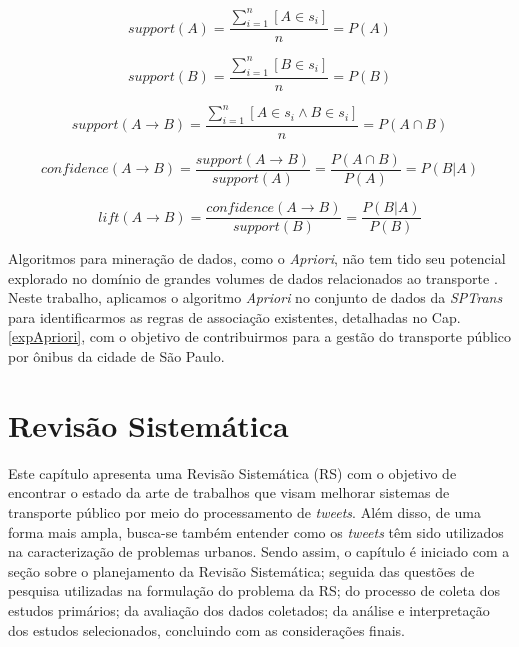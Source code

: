 \documentclass[
	12pt,				%
	oneside,			%
	a4paper,			%
	english,			%
	brazil				%
	]{abntex2ppgsi}
\begin{document}
{{\begin{equation}
\label{eqSupportA}
support(A) = \dfrac{\sum_{i=1}^{n}[A \in s_i]} {n} = P(A) 
\end{equation}

\begin{equation}
\label{eqSupportB}
support(B) = \dfrac{\sum_{i=1}^{n}[B \in s_i]} {n} = P(B) 
\end{equation}

\begin{equation}
\label{eqSupports}
support(A \rightarrow B) = \dfrac{\sum_{i=1}^{n}[A \in s_i \land B \in s_i]} {n} = P(A \cap B)
\end{equation}

\begin{equation}
\label{eqConfidence}
confidence(A \rightarrow B) = \dfrac{support(A \rightarrow B)}{support(A)} = \dfrac{P(A \cap B)}{P(A)} = P(B|A)
\end{equation}

\begin{equation}
\label{eqLift}
lift(A \rightarrow B) = \dfrac{confidence(A \rightarrow B)}{support(B)} = \dfrac{P(B|A)}{P(B)}
\end{equation}

Algoritmos para mineração de dados, como o \textit{Apriori}, não tem tido seu potencial explorado no domínio de grandes volumes de dados relacionados ao transporte \cite{park2018apriori}. Neste trabalho, aplicamos o algoritmo \textit{Apriori} no conjunto de dados da \textit{SPTrans} para identificarmos as regras de associação existentes, detalhadas no Cap. \ref{expApriori}, com o objetivo de contribuirmos para a gestão do transporte público por ônibus da cidade de São Paulo.   

\chapter{Revisão Sistemática}
\label{revisao}
Este capítulo apresenta uma Revisão Sistemática (RS) com o objetivo de encontrar o estado da arte de trabalhos que visam melhorar sistemas de transporte público por meio do processamento de \textit{tweets}. Além disso, de uma forma mais ampla, busca-se também entender como os \textit{tweets} têm sido utilizados na caracterização de problemas urbanos. Sendo assim, o capítulo é iniciado com a seção sobre o planejamento da Revisão Sistemática; seguida das questões de pesquisa utilizadas na formulação do problema da RS; do processo de coleta dos estudos primários; da avaliação dos dados coletados; da análise e interpretação dos estudos selecionados, concluindo com as considerações finais.

}}
\end{document}
